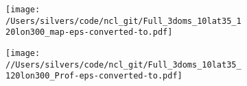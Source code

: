 \documentclass[varwidth, border=10pt]{standalone}
\begin{document}

\begin{figure}
  \centering
  \begin{subfigure}{0.5\textwidth}
  \centering
    \texttt{[image: /Users/silvers/code/ncl\_git/Full\_3doms\_10lat35\_120lon300\_map-eps-converted-to.pdf]}
 \end{subfigure}
\begin{subfigure}{0.31\textwidth}
\centering
  \texttt{[image: //Users/silvers/code/ncl\_git/Full\_3doms\_10lat35\_120lon300\_Prof-eps-converted-to.pdf]}
\end{subfigure}
 \end{figure}
\end{document}

